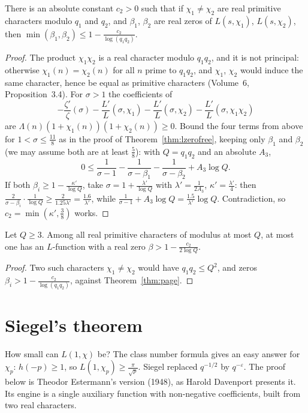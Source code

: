 \begin{theorem}\label{thm:page}
There is an absolute constant $c_2>0$ such that if $\chi_1\ne\chi_2$ are real primitive characters modulo $q_1$ and $q_2$, and $\beta_1$, $\beta_2$ are real zeros of $L(s,\chi_1)$, $L(s,\chi_2)$, then $\min(\beta_1,\beta_2)\le1-\frac{c_2}{\log(q_1q_2)}$.
\end{theorem}
\begin{proof}
The product $\chi_1\chi_2$ is a real character modulo $q_1q_2$, and it is not principal: otherwise $\chi_1(n)=\chi_2(n)$ for all $n$ prime to $q_1q_2$, and $\chi_1$, $\chi_2$ would induce the same character, hence be equal as primitive characters (Volume~6, Proposition~3.4). For $\sigma>1$ the coefficients of
\[
-\frac{\zeta'}\zeta(\sigma)-\frac{L'}L(\sigma,\chi_1)-\frac{L'}L(\sigma,\chi_2)-\frac{L'}L(\sigma,\chi_1\chi_2)
\]
are $\Lambda(n)(1+\chi_1(n))(1+\chi_2(n))\ge0$. Bound the four terms from above for $1<\sigma\le\frac{11}8$ as in the proof of Theorem~\ref{thm:lzerofree}, keeping only $\beta_1$ and $\beta_2$ (we may assume both are at least $\frac58$): with $Q=q_1q_2$ and an absolute $A_3$,
\[
0\le\frac1{\sigma-1}-\frac1{\sigma-\beta_1}-\frac1{\sigma-\beta_2}+A_3\log Q.
\]
If both $\beta_i\ge1-\frac{\kappa'}{\log Q}$, take $\sigma=1+\frac{\lambda'}{\log Q}$ with $\lambda'=\frac1{2A_3}$, $\kappa'=\frac{\lambda'}4$: then $\frac2{\sigma-\beta_i}\cdot\frac1{\log Q}\ge\frac2{1.25\lambda'}=\frac{1.6}{\lambda'}$, while $\frac1{\sigma-1}+A_3\log Q=\frac{1.5}{\lambda'}\log Q$. Contradiction, so $c_2=\min(\kappa',\frac38)$ works.
\end{proof}

\begin{corollary}[Page, 1935]\label{cor:page}
Let $Q\ge3$. Among all real primitive characters of modulus at most $Q$, at most one has an $L$-function with a real zero $\beta>1-\frac{c_2}{2\log Q}$.
\end{corollary}
\begin{proof}
Two such characters $\chi_1\ne\chi_2$ would have $q_1q_2\le Q^2$, and zeros $\beta_i>1-\frac{c_2}{\log(q_1q_2)}$, against Theorem~\ref{thm:page}.
\end{proof}

\section{Siegel's theorem}

How small can $L(1,\chi)$ be? The class number formula gives an easy answer for $\chi_p$: $h(-p)\ge1$, so $L(1,\chi_p)\ge\frac\pi{\sqrt p}$. Siegel replaced $q^{-1/2}$ by $q^{-\varepsilon}$. The proof below is Theodor Estermann's version (1948), as Harold Davenport presents it. Its engine is a single auxiliary function with non-negative
coefficients, built from two real characters.

